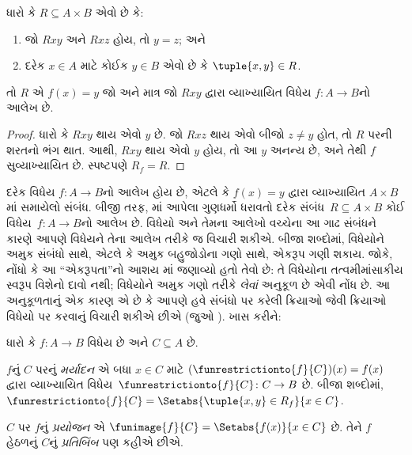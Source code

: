 \begin{prop}
ધારો કે $R \subseteq A \times B$ એવો છે કે:
\begin{enumerate}
\item જો $Rxy$ અને $Rxz$ હોય, તો $y = z$; અને
\item દરેક $x \in A$ માટે કોઈક $y \in B$ એવો છે
કે $\tuple{x,
y} \in R$.
\end{enumerate}
તો $R$ એ $f(x) = y$ જો અને માત્ર જો $Rxy$
દ્વારા વ્યાખ્યાયિત વિધેય $f\colon A \to B$નો આલેખ છે.
\end{prop}

\begin{proof}
ધારો કે $Rxy$ થાય એવો $y$ છે. જો $Rxz$ થાય એવો
બીજો $z \neq
y$ હોત, તો $R$ પરની શરતનો ભંગ થાત.
આથી, $Rxy$ થાય એવો $y$ હોય, તો આ $y$ અનન્ય છે,
અને તેથી $f$ સુવ્યાખ્યાયિત છે. સ્પષ્ટપણે $R_f = R$.
\end{proof}

\begin{explain}
દરેક વિધેય $f\colon A \to B$નો આલેખ હોય છે, એટલે કે
$f(x) = y$ દ્વારા વ્યાખ્યાયિત $A
\times B$માં સમાયેલો સંબંધ. બીજી તરફ,
માં આપેલા ગુણધર્મો ધરાવતો
દરેક સંબંધ~$R
\subseteq A \times B$ કોઈ વિધેય~$f \colon A \to
B$નો આલેખ છે. વિધેયો અને તેમના આલેખો વચ્ચેના આ ગાઢ
સંબંધને કારણે આપણે વિધેયને તેના આલેખ તરીકે જ વિચારી શકીએ.
બીજા શબ્દોમાં, વિધેયોને અમુક સંબંધો સાથે, એટલે કે અમુક
બહુજોડોના ગણો સાથે, એકરૂપ ગણી શકાય.
જોકે, નોંધો કે આ “એકરૂપતા”નો
આશય માં જણાવ્યો હતો તેવો છે:
તે વિધેયોના તત્વમીમાંસાકીય સ્વરૂપ વિશેનો દાવો નથી;
વિધેયોને અમુક ગણો તરીકે \emph{લેવાં} અનુકૂળ છે એવી
નોંધ છે. આ અનુકૂળતાનું એક કારણ એ છે કે આપણે
હવે સંબંધો પર કરેલી ક્રિયાઓ જેવી ક્રિયાઓ વિધેયો પર
કરવાનું વિચારી શકીએ છીએ (જુઓ ).
ખાસ કરીને:
\end{explain}

\begin{defn}
ધારો કે $f \colon A \to B$ વિધેય છે અને $C\subseteq A$ છે.

$f$નું $C$ પરનું \emph{મર્યાદન} એ બધા $x \in C$ માટે
$(\funrestrictionto{f}{C})(x) = f(x)$ દ્વારા વ્યાખ્યાયિત
વિધેય~$\funrestrictionto{f}{C}\colon C \to B$ છે.
બીજા શબ્દોમાં, $\funrestrictionto{f}{C} = \Setabs{\tuple{x, y} \in R_f}{x \in
C}$.

$C$ પર $f$નું \emph{પ્રયોજન} એ $\funimage{f}{C} =
\Setabs{f(x)}{x \in C}$ છે. તેને $f$ હેઠળનું
$C$નું \emph{પ્રતિબિંબ} પણ કહીએ છીએ.
\end{defn}

